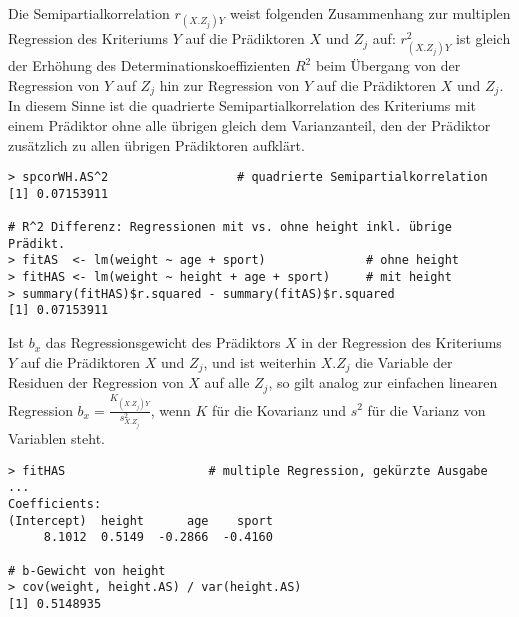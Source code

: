 Die Semipartialkorrelation $r_{(X.Z_{j})Y}$ weist folgenden Zusammenhang zur multiplen Regression des Kriteriums $Y$ auf die Prädiktoren $X$ und $Z_{j}$ auf: $r_{(X.Z_{j})Y}^{2}$ ist gleich der Erhöhung des Determinationskoeffizienten $R^{2}$ beim Übergang von der Regression von $Y$ auf $Z_{j}$ hin zur Regression von $Y$ auf die Prädiktoren $X$ und $Z_{j}$. In diesem Sinne ist die quadrierte Semipartialkorrelation des Kriteriums mit einem Prädiktor ohne alle übrigen gleich dem Varianzanteil, den der Prädiktor zusätzlich zu allen übrigen Prädiktoren aufklärt.
\begin{lstlisting}
> spcorWH.AS^2                  # quadrierte Semipartialkorrelation
[1] 0.07153911

# R^2 Differenz: Regressionen mit vs. ohne height inkl. übrige Prädikt.
> fitAS  <- lm(weight ~ age + sport)              # ohne height
> fitHAS <- lm(weight ~ height + age + sport)     # mit height
> summary(fitHAS)$r.squared - summary(fitAS)$r.squared
[1] 0.07153911
\end{lstlisting}

Ist $b_{x}$ das Regressionsgewicht des Prädiktors $X$ in der Regression des Kriteriums $Y$ auf die Prädiktoren $X$ und $Z_{j}$, und ist weiterhin $X.Z_{j}$ die Variable der Residuen der Regression von $X$ auf alle $Z_{j}$, so gilt analog zur einfachen linearen Regression $b_{x} = \frac{K_{(X.Z_{j})Y}}{s^{2}_{X.Z_{j}}}$, wenn $K$ für die Kovarianz und $s^{2}$ für die Varianz von Variablen steht.
\begin{lstlisting}
> fitHAS                    # multiple Regression, gekürzte Ausgabe ...
Coefficients:
(Intercept)  height      age    sport
     8.1012  0.5149  -0.2866  -0.4160

# b-Gewicht von height
> cov(weight, height.AS) / var(height.AS)
[1] 0.5148935
\end{lstlisting}
